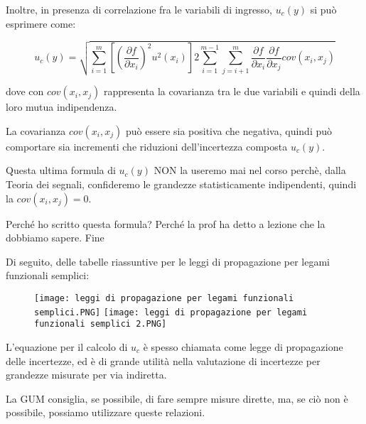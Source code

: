Inoltre, in presenza di correlazione fra le variabili di ingresso, 
$u_c (y)$ si può esprimere come: 

{
    \Large 
    \begin{equation}
        u_c (y) = \sqrt{\sum_{i = 1}^{m} \left[ \left( \frac{\partial f}{\partial x_i} \right) ^{2} u^{2} (x_i)\right]
        2 \sum_{i=1}^{m-1} \sum_{j = i+1}^{m}
        \frac{\partial f}{\partial x_i}
        \frac{\partial f}{\partial x_j}
        cov (x_i, x_j)        
        }        
    \end{equation}
}

dove con $cov(x_i, x_j)$ rappresenta la covarianza tra le due variabili e quindi della loro mutua indipendenza. \newline 

La covarianza $cov(x_i, x_j)$ può essere sia positiva che negativa, quindi può comportare sia incrementi che riduzioni dell'incertezza composta $u_c (y)$. \newline 

\begin{tcolorbox}
    Questa ultima formula di $u_c (y)$ NON la useremo mai nel corso perchè, dalla Teoria dei segnali, confideremo le grandezze statisticamente indipendenti, 
    quindi la $cov (x_i, x_j)  = 0$. \newline 

    Perché ho scritto questa formula? Perché la prof ha detto a lezione che la dobbiamo sapere. Fine
\end{tcolorbox}

Di seguito, delle tabelle riassuntive per le leggi di propagazione per legami funzionali semplici: 

\begin{figure}[h]
    \centering
    \texttt{[image: leggi di propagazione per legami funzionali semplici.PNG]}
    \texttt{[image: leggi di propagazione per legami funzionali semplici 2.PNG]}
\end{figure}

\newpage

L'equazione per il calcolo di $u_c$ è spesso chiamata come legge di propagazione delle incertezze, 
ed è di grande utilità nella valutazione di incertezze per grandezze misurate per via indiretta. \newline 

La GUM consiglia, se possibile, di fare sempre misure dirette, ma, se ciò non è possibile, possiamo utilizzare queste relazioni. \newline 

